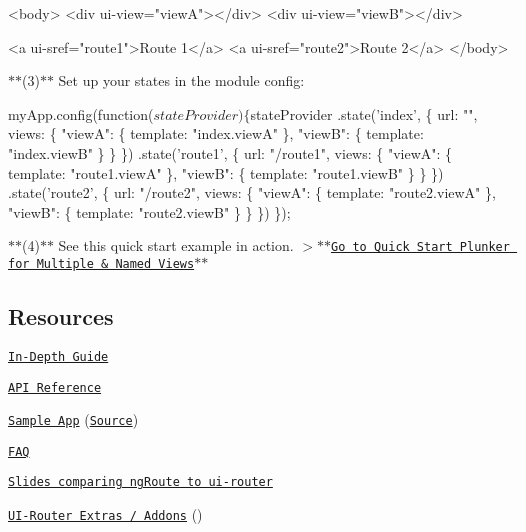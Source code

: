 \begin{DoxyCode}
<body>
    <div ui-view="viewA"></div>
    <div ui-view="viewB"></div>
    
    <a ui-sref="route1">Route 1</a>
    <a ui-sref="route2">Route 2</a>
</body>
\end{DoxyCode}


$\ast$$\ast$(3)$\ast$$\ast$ Set up your states in the module config\+: \begin{quote}


\end{quote}

\begin{DoxyCode}
myApp.config(function($stateProvider) \{
  $stateProvider
    .state('index', \{
      url: "",
      views: \{
        "viewA": \{ template: "index.viewA" \},
        "viewB": \{ template: "index.viewB" \}
      \}
    \})
    .state('route1', \{
      url: "/route1",
      views: \{
        "viewA": \{ template: "route1.viewA" \},
        "viewB": \{ template: "route1.viewB" \}
      \}
    \})
    .state('route2', \{
      url: "/route2",
      views: \{
        "viewA": \{ template: "route2.viewA" \},
        "viewB": \{ template: "route2.viewB" \}
      \}
    \})
\});
\end{DoxyCode}


$\ast$$\ast$(4)$\ast$$\ast$ See this quick start example in action. $>$$\ast$$\ast$\href{http://plnkr.co/edit/SDOcGS?p=preview}{\tt Go to Quick Start Plunker for Multiple \& Named Views}$\ast$$\ast$

\subsection*{Resources}


\begin{DoxyItemize}
\item \href{https://github.com/angular-ui/ui-router/wiki}{\tt In-\/\+Depth Guide}
\item \href{http://angular-ui.github.io/ui-router/site}{\tt A\+PI Reference}
\item \href{http://angular-ui.github.com/ui-router/sample/}{\tt Sample App} (\href{https://github.com/angular-ui/ui-router/tree/gh-pages/sample}{\tt Source})
\item \href{https://github.com/angular-ui/ui-router/wiki/Frequently-Asked-Questions}{\tt F\+AQ}
\item \href{http://slid.es/timkindberg/ui-router#/}{\tt Slides comparing ng\+Route to ui-\/router}
\item \href{http://christopherthielen.github.io/ui-router-extras/#/home}{\tt U\+I-\/\+Router Extras / Addons} ()
\end{DoxyItemize}

